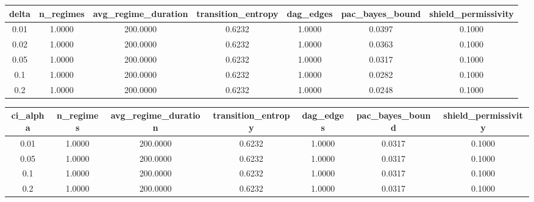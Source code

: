 \begin{tabular}{ccccccc}
\toprule
delta & n\_regimes & avg\_regime\_duration & transition\_entropy & dag\_edges & pac\_bayes\_bound & shield\_permissivity \\
\midrule
0.01 & 1.0000 & 200.0000 & 0.6232 & 1.0000 & 0.0397 & 0.1000 \\
0.02 & 1.0000 & 200.0000 & 0.6232 & 1.0000 & 0.0363 & 0.1000 \\
0.05 & 1.0000 & 200.0000 & 0.6232 & 1.0000 & 0.0317 & 0.1000 \\
0.1 & 1.0000 & 200.0000 & 0.6232 & 1.0000 & 0.0282 & 0.1000 \\
0.2 & 1.0000 & 200.0000 & 0.6232 & 1.0000 & 0.0248 & 0.1000 \\
\bottomrule
\end{tabular}

\begin{tabular}{ccccccc}
\toprule
ci_alpha & n\_regimes & avg\_regime\_duration & transition\_entropy & dag\_edges & pac\_bayes\_bound & shield\_permissivity \\
\midrule
0.01 & 1.0000 & 200.0000 & 0.6232 & 1.0000 & 0.0317 & 0.1000 \\
0.05 & 1.0000 & 200.0000 & 0.6232 & 1.0000 & 0.0317 & 0.1000 \\
0.1 & 1.0000 & 200.0000 & 0.6232 & 1.0000 & 0.0317 & 0.1000 \\
0.2 & 1.0000 & 200.0000 & 0.6232 & 1.0000 & 0.0317 & 0.1000 \\
\bottomrule
\end{tabular}
